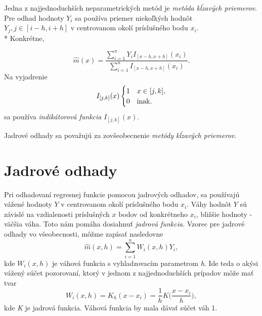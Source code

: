 Jedna z najjednoduchších neparametrických metód je \textit{ metóda kĺzavých priemerov}. Pre odhad hodnoty $Y_i$ sa používa priemer niekoľkých hodnôt $Y_j,  j\in [i-h,i+h]$ v centrovanom okolí príslušného bodu $x_i$. \\*
Konkrétne,
 
\begin{equation}\label{metodaVazenychPriemerov}
\hat{m}(x) = \dfrac{\sum\limits_{i=1}^{n}  Y_i I_{[x - h, x + h]}(x_i)}{\sum\limits_{i=1}^{n} I_{[x - h, x + h]}(x_i)}.
\end{equation}
Na vyjadrenie 
\begin{equation}\label{indikatorovaFunkcia}
I_{[j,k]}(x) \begin{cases}
1 & x \in [j,k], \\ 
0 & $inak.$
\end{cases}
\end{equation}
sa používa \textit{indikátorová funkcia} $I_{[j,k]}(x)$.

Jadrové odhady sa považujú za zovšeobecnenie \textit{metódy kĺzavých priemerov}.


\section{Jadrové odhady}\label{JadroveOdhady}

Pri odhadovaní regresnej funkcie pomocou jadrových odhadov, sa používajú vážené hodnoty $Y$ v centrovanom okolí príslušného bodu $x_i$. Váhy hodnôt $Y$ sú závislé na vzdialenosti príslušných $x$ bodov od konkrétneho $x_i$, bližšie hodnoty  -  väčšia váha. Toto nám pomáha dosiahnuť \textit{jadrová funkcia}. 
Vzorec pre jadrové odhady vo všeobecnosti, môžme zapísať nasledovne
\begin{equation}
\hat{m}(x,h) = \sum\limits_{i=1}^{n} W_i(x,h)Y_i,
\end{equation}
kde $ W_i(x,h)$ je váhová funkcia s vyhladzovacím parametrom \textit{h}. Ide teda o akýsi vážený súčet pozorovaní, ktorý v jednom z najjednoduchších prípadov môže mať tvar
\begin{equation}\label{vahovaFunkcia}
W_i(x,h) = K_h(x - x_i) = \frac{1}{h}K\Big(\frac{x-x_i}{h}\Big),
\end{equation}
kde \textit{K} je jadrová funkcia. Váhová funkcia by mala dávať súčet váh 1.

